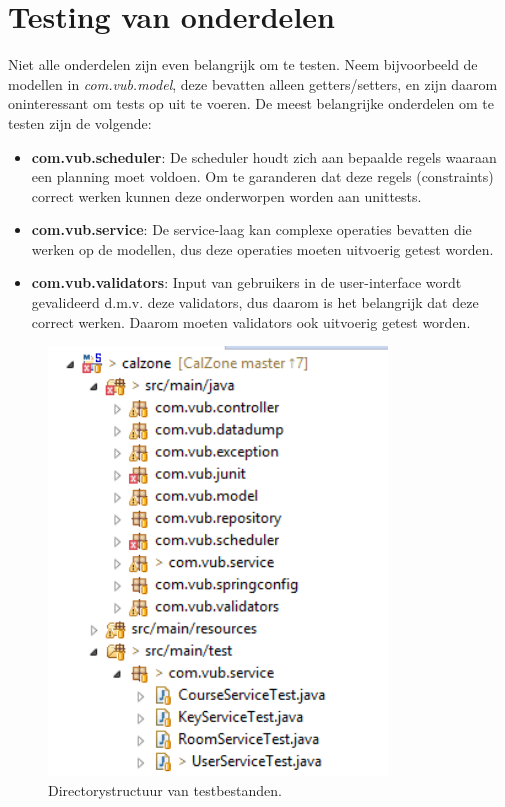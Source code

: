 \section{Testing van onderdelen}
Niet alle onderdelen zijn even belangrijk om te testen. Neem bijvoorbeeld de modellen in \emph{com.vub.model}, deze bevatten alleen getters/setters, en zijn daarom oninteressant om tests op uit te voeren. De meest belangrijke onderdelen om te testen zijn de volgende:
\begin{itemize}
	\item \textbf{com.vub.scheduler}: De scheduler houdt zich aan bepaalde regels waaraan een planning moet voldoen. 
	Om te garanderen dat deze regels (constraints) correct werken kunnen deze onderworpen worden aan unittests.
	\item \textbf{com.vub.service}: De service-laag kan complexe operaties bevatten die werken op de modellen, dus deze operaties moeten uitvoerig getest worden.
	\item \textbf{com.vub.validators}: Input van gebruikers in de user-interface wordt gevalideerd d.m.v. deze validators, dus daarom is het belangrijk dat deze correct werken.
	Daarom moeten validators ook uitvoerig getest worden.
\end{itemize}
	
\begin{figure}[ht!]
\centering
\includegraphics[width=90mm]{img/dir.png}
\caption{Directorystructuur van testbestanden.}
\label{dirstruct}
\end{figure}

